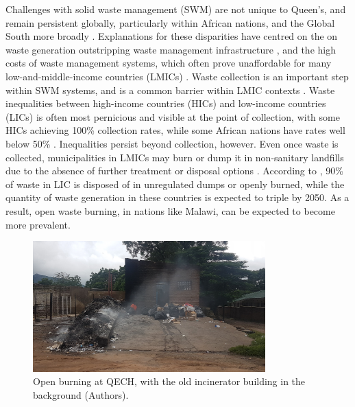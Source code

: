 \documentclass[
  authoryear,
  review,
  3p]{elsarticle}
\begin{document}
Challenges with solid waste management (SWM) are not unique to Queen's,
and remain persistent globally, particularly within African nations, and
the Global South more broadly
\citep{bundhoo2018solid, sergekubanza2022exploring, muheirwe2022paradox, srivastava2015urban}.
Explanations for these disparities have centred on the on waste
generation outstripping waste management infrastructure
\citep{muheirwe2022paradox}, and the high costs of waste management
systems, which often prove unaffordable for many low-and-middle-income
countries (LMICs) \citep{guerrero2013solid, sergekubanza2022exploring}.
Waste collection is an important step within SWM systems, and is a
common barrier within LMIC contexts \citep{bundhoo2018solid}. Waste
inequalities between high-income countries (HICs) and low-income
countries (LICs) is often most pernicious and visible at the point of
collection, with some HICs achieving 100\% collection rates, while some
African nations have rates well below 50\% \citep{shi2021unbalanced}.
Inequalities persist beyond collection, however. Even once waste is
collected, municipalities in LMICs may burn or dump it in non-sanitary
landfills due to the absence of further treatment or disposal options
\citep{cook2021globala}. According to \citet{kaza2018what}, 90\% of
waste in LIC is disposed of in unregulated dumps or openly burned, while
the quantity of waste generation in these countries is expected to
triple by 2050. As a result, open waste burning, in nations like Malawi,
can be expected to become more prevalent.

\begin{figure}

{\centering \includegraphics[width=0.8\textwidth,height=\textheight]{img/open-waste-burning-incinerator-qech.jpg}

}

\caption{\label{fig-open-burning}Open burning at QECH, with the old
incinerator building in the background (Authors).}

\end{figure}
\end{document}
